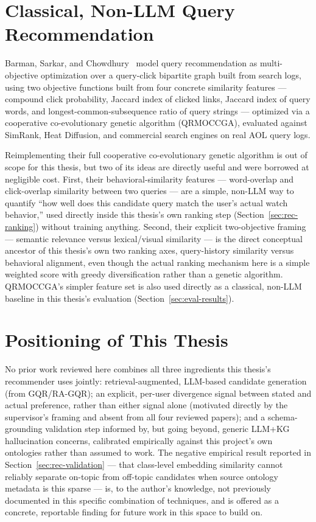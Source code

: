 \section{Classical, Non-LLM Query Recommendation}
\label{sec:rel-qrmoccga}

Barman, Sarkar, and Chowdhury~\cite{barman2024} model query recommendation as multi-objective
optimization over a query-click bipartite graph built from search logs, using two objective
functions built from four concrete similarity features --- compound click probability, Jaccard
index of clicked links, Jaccard index of query words, and longest-common-subsequence ratio of query
strings --- optimized via a cooperative co-evolutionary genetic algorithm (QRMOCCGA), evaluated
against SimRank, Heat Diffusion, and commercial search engines on real AOL query logs.

Reimplementing their full cooperative co-evolutionary genetic algorithm is out of scope for this
thesis, but two of its ideas are directly useful and were borrowed at negligible cost. First, their
behavioral-similarity features --- word-overlap and click-overlap similarity between two queries ---
are a simple, non-LLM way to quantify ``how well does this candidate query match the user's actual
watch behavior,'' used directly inside this thesis's own ranking step
(Section~\ref{sec:rec-ranking}) without training anything. Second, their explicit two-objective
framing --- semantic relevance versus lexical/visual similarity --- is the direct conceptual
ancestor of this thesis's own two ranking axes, query-history similarity versus behavioral
alignment, even though the actual ranking mechanism here is a simple weighted score with greedy
diversification rather than a genetic algorithm. QRMOCCGA's simpler feature set is also used
directly as a classical, non-LLM baseline in this thesis's evaluation (Section~\ref{sec:eval-results}).

\section{Positioning of This Thesis}
\label{sec:rel-position}

No prior work reviewed here combines all three ingredients this thesis's recommender uses jointly:
retrieval-augmented, LLM-based candidate generation (from GQR/RA-GQR); an explicit, per-user
divergence signal between stated and actual preference, rather than either signal alone (motivated
directly by the supervisor's framing and absent from all four reviewed papers); and a
schema-grounding validation step informed by, but going beyond, generic LLM+KG hallucination
concerns, calibrated empirically against this project's own ontologies rather than assumed to work.
The negative empirical result reported in Section~\ref{sec:rec-validation} --- that class-level
embedding similarity cannot reliably separate on-topic from off-topic candidates when source
ontology metadata is this sparse --- is, to the author's knowledge, not previously documented in
this specific combination of techniques, and is offered as a concrete, reportable finding for
future work in this space to build on.
